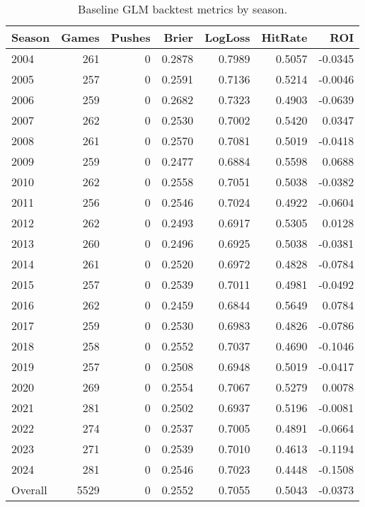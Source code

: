 \begin{table}[t]
  \centering
  \footnotesize
  \caption[Baseline GLM backtest]{Baseline GLM backtest metrics by season.}
  \label{tab:glm-baseline}
  \setlength{\tabcolsep}{3pt}\renewcommand{\arraystretch}{1.1}
  \begin{tabular}{@{} l r r r r r r @{} }
    \toprule
 \textbf{Season} & \textbf{Games} & \textbf{Pushes} & \textbf{Brier} & \textbf{LogLoss} & \textbf{HitRate} & \textbf{ROI} \\ 
    \midrule
      2004 & 261 & 0 & 0.2878 & 0.7989 & 0.5057 & -0.0345 \\
      2005 & 257 & 0 & 0.2591 & 0.7136 & 0.5214 & -0.0046 \\
      2006 & 259 & 0 & 0.2682 & 0.7323 & 0.4903 & -0.0639 \\
      2007 & 262 & 0 & 0.2530 & 0.7002 & 0.5420 & 0.0347 \\
      2008 & 261 & 0 & 0.2570 & 0.7081 & 0.5019 & -0.0418 \\
      2009 & 259 & 0 & 0.2477 & 0.6884 & 0.5598 & 0.0688 \\
      2010 & 262 & 0 & 0.2558 & 0.7051 & 0.5038 & -0.0382 \\
      2011 & 256 & 0 & 0.2546 & 0.7024 & 0.4922 & -0.0604 \\
      2012 & 262 & 0 & 0.2493 & 0.6917 & 0.5305 & 0.0128 \\
      2013 & 260 & 0 & 0.2496 & 0.6925 & 0.5038 & -0.0381 \\
      2014 & 261 & 0 & 0.2520 & 0.6972 & 0.4828 & -0.0784 \\
      2015 & 257 & 0 & 0.2539 & 0.7011 & 0.4981 & -0.0492 \\
      2016 & 262 & 0 & 0.2459 & 0.6844 & 0.5649 & 0.0784 \\
      2017 & 259 & 0 & 0.2530 & 0.6983 & 0.4826 & -0.0786 \\
      2018 & 258 & 0 & 0.2552 & 0.7037 & 0.4690 & -0.1046 \\
      2019 & 257 & 0 & 0.2508 & 0.6948 & 0.5019 & -0.0417 \\
      2020 & 269 & 0 & 0.2554 & 0.7067 & 0.5279 & 0.0078 \\
      2021 & 281 & 0 & 0.2502 & 0.6937 & 0.5196 & -0.0081 \\
      2022 & 274 & 0 & 0.2537 & 0.7005 & 0.4891 & -0.0664 \\
      2023 & 271 & 0 & 0.2539 & 0.7010 & 0.4613 & -0.1194 \\
      2024 & 281 & 0 & 0.2546 & 0.7023 & 0.4448 & -0.1508 \\
      Overall & 5529 & 0 & 0.2552 & 0.7055 & 0.5043 & -0.0373 \\
    \bottomrule
  \end{tabular}
\end{table}
